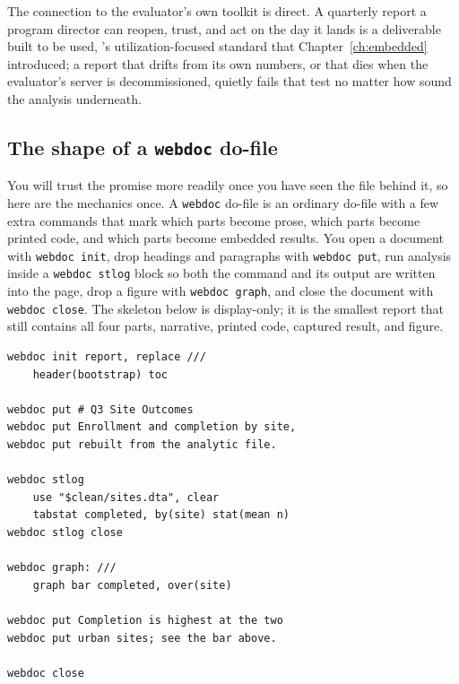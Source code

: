 \documentclass[
    a4paper,
    fontsize=10pt,
    twoside=true,
    numbers=noenddot,
]{kaobook}
\begin{document}
The connection to the evaluator's own toolkit is direct. A quarterly report a program director can reopen, trust, and act on the day it lands is a deliverable built to be used, \textcite{patton2008utilization}'s utilization-focused standard that Chapter~\ref{ch:embedded} introduced; a report that drifts from its own numbers, or that dies when the evaluator's server is decommissioned, quietly fails that test no matter how sound the analysis underneath.

\subsection{The shape of a \texttt{webdoc} do-file}
You will trust the promise more readily once you have seen the file behind it, so here are the mechanics once. A \texttt{webdoc} do-file is an ordinary do-file with a few extra commands that mark which parts become prose, which parts become printed code, and which parts become embedded results. You open a document with \texttt{webdoc init}, drop headings and paragraphs with \texttt{webdoc put}, run analysis inside a \texttt{webdoc stlog} block so both the command and its output are written into the page, drop a figure with \texttt{webdoc graph}, and close the document with \texttt{webdoc close}. The skeleton below is display-only; it is the smallest report that still contains all four parts, narrative, printed code, captured result, and figure.
\par
{\footnotesize
\begin{verbatim}
webdoc init report, replace ///
    header(bootstrap) toc

webdoc put # Q3 Site Outcomes
webdoc put Enrollment and completion by site,
webdoc put rebuilt from the analytic file.

webdoc stlog
    use "$clean/sites.dta", clear
    tabstat completed, by(site) stat(mean n)
webdoc stlog close

webdoc graph: ///
    graph bar completed, over(site)

webdoc put Completion is highest at the two
webdoc put urban sites; see the bar above.

webdoc close
\end{verbatim}
}
\end{document}
